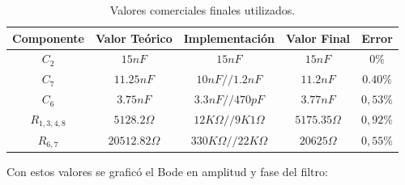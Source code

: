 \begin{table}[H]
\centering
\begin{tabular}{@{}ccccc@{}}
\toprule
Componente & Valor Teórico & Implementación & Valor Final & Error \\ \midrule
$C_2$ & $15nF$ & $15nF$ & $15nF$ & $0\%$ \\
$C_7$ & $11.25nF$ & $10nF//1.2nF$ & $11.2nF$ & $0.40\%$ \\
$C_6$ & $3.75nF$ & $3.3nF//470pF$ & $3.77nF$ & $0,53\%$\\
$R_{1,3,4,8}$ & $5128.2 \Omega$ & $12K\Omega//9K1\Omega$ & $5175.35 \Omega$ & $0,92\%$ \\
$R_{6,7}$ & $20512.82 \Omega$ & $330K\Omega//22K\Omega$ & $20625\Omega$ & $0,55\%$ \\ \bottomrule
\end{tabular}
\caption{Valores comerciales finales utilizados.}
\label{Tab:valores}
\end{table}

Con estos valores se graficó el Bode en amplitud y fase del filtro:

